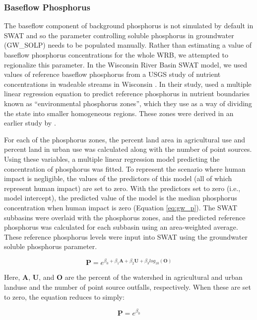 \subsubsection{Baseflow Phosphorus} \label{sec:gwp}
	The baseflow component of background phosphorus is not simulated by default in SWAT and so the parameter controlling soluble phosphorus in groundwater (GW\_SOLP) needs to be populated manually. Rather than estimating a value of baseflow phosphorus concentrations for the whole WRB, we attempted to regionalize this parameter. In the Wisconsin River Basin SWAT model, we used values of reference baseflow phosphorus from a USGS study of nutrient concentrations in wadeable streams in Wisconsin \citep{robertson_wadeable_2006}. In their study, \citet{robertson_wadeable_2006} used a multiple linear regression equation to predict reference phosphorus in nutrient boundaries known as ``environmental phosphorus zones'', which they use as a way of dividing the state into smaller homogeneous regions. These zones were derived in an earlier study by \citet{robertson_phosphoruszones_2006}.

	
	For each of the phosphorus zones, the percent land area in agricultural use and percent land in urban use was calculated along with the number of point sources. Using these variables, a multiple linear regression model predicting the concentration of phosphorus was fitted. To represent the scenario where human impact is negligible, the values of the predictors of this model (all of which represent human impact) are set to zero. With the predictors set to zero (i.e., model intercept), the predicted value of the model is the median phosphorus concentration when human impact is zero (Equation \ref{eq:gw_p}). The SWAT subbasins were overlaid with the phosphorus zones, and the predicted reference phosphorus was calculated for each subbasin using an area-weighted average. These reference phosphorus levels were input into SWAT using the groundwater soluble phosphorus parameter.
	
	
	\begin{equation}
	\bm{P} = e^{\beta_0 + \beta_1 \bm{A} + \beta_2 \bm{U} + \beta_3 log_{10}(\bm{O})}
	\label{eq:gw_p}
	\end{equation}
		
	Here, $\bm{A}$, $\bm{U}$, and $\bm{O}$ are the percent of the watershed in agricultural and urban landuse and the number of point source outfalls, respectively. When these are set to zero, the equation reduces to simply:
	
	\begin{equation}
	\bm{P} = e^{\beta_0}
	\end{equation}
	
